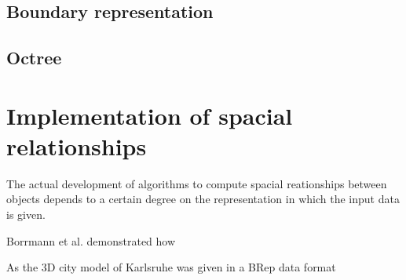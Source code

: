 \documentclass[paper=a4, fontsize=11pt]{scrartcl} %
\numberwithin{equation}{section} %
\numberwithin{figure}{section} %
\numberwithin{table}{section} %
\begin{document}
\subsection{Boundary representation}

\subsection{Octree}




\section{Implementation of spacial relationships}
The actual development of algorithms to compute spacial reationships between objects depends to a certain degree on the representation in which the input data is given. 

Borrmann et al. \cite{Daum2014} demonstrated how 




As the 3D city model of Karlsruhe was given in a BRep data format 





{}

\end{document}
